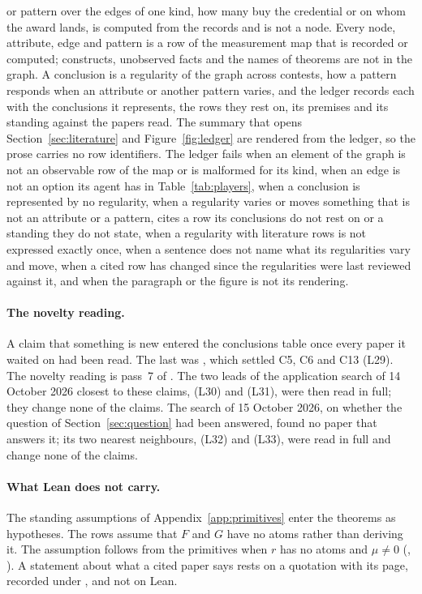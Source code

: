\begin{enumerate}
  or pattern over the edges of one kind, how many buy the credential or on whom
  the award lands, is computed from the records and is not a node. Every node,
  attribute, edge and pattern is a row of the measurement map that is recorded
  or computed; constructs, unobserved facts and the names of theorems are not in
  the graph. A conclusion is a regularity of the graph across contests, how a
  pattern responds when an attribute or another pattern varies, and the ledger
  records each with the conclusions it represents, the rows they rest on, its
  premises and its standing against the papers read. The summary that opens
  Section~\ref{sec:literature} and Figure~\ref{fig:ledger} are rendered from
  the ledger, so the prose carries no row identifiers. The ledger fails when an
  element of the graph is not an observable row of the map or is malformed for
  its kind, when an edge is not an option its agent has in
  Table~\ref{tab:players}, when a conclusion is represented by no regularity,
  when a regularity varies or moves something that is not an attribute or a
  pattern, cites a row its conclusions do not rest on or a standing they do not
  state, when a regularity with literature rows is not expressed exactly once,
  when a sentence does not name what its regularities vary and move, when a
  cited row has changed since the regularities were last reviewed against it,
  and when the paragraph or the figure is not its rendering.
\end{enumerate}

\paragraph{The novelty reading.} A claim that something is new entered the
conclusions table once every paper it waited on had been read. The last was
\citet{CorcoranKarels1985}, which settled C5, C6 and C13 (L29). The novelty
reading is pass~7 of . The two leads of the application search of
14 October 2026 closest to these claims, \citet{FernandezGali1999} (L30) and
\citet{HassinHaviv1997} (L31), were then read in full; they change none of the
claims. The search of 15 October 2026, on whether the question of
Section~\ref{sec:question} had been answered, found no paper that answers it;
its two nearest neighbours, \citet{LiuGargBorgs2022} (L32) and
\citet{HuImmorlicaVaughan2019} (L33), were read in full and change none of the
claims.

\paragraph{What Lean does not carry.} The standing assumptions of
Appendix~\ref{app:primitives} enter the theorems as hypotheses. The rows assume
that $F$ and $G$ have no atoms rather than deriving it. The assumption follows
from the primitives when $r$ has no atoms and $\mu\ne0$
(,
). A statement about what a
cited paper says rests on a quotation with its page, recorded under
, and not on Lean.

